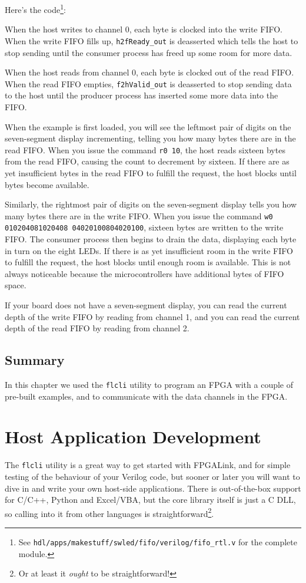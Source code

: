 Here's the code\footnote{See \texttt{hdl/apps/makestuff/swled/fifo/verilog/fifo\_rtl.v} for the complete module.}:


When the host writes to channel 0, each byte is clocked into the write FIFO. When the write FIFO fills up, \texttt{h2fReady\_out} is deasserted which tells the host to stop sending until the consumer process has freed up some room for more data.

When the host reads from channel 0, each byte is clocked out of the read FIFO. When the read FIFO empties, \texttt{f2hValid\_out} is deasserted to stop sending data to the host until the producer process has inserted some more data into the FIFO.

When the example is first loaded, you will see the leftmost pair of digits on the seven-segment display incrementing, telling you how many bytes there are in the read FIFO. When you issue the command \texttt{r0 10}, the host reads sixteen bytes from the read FIFO, causing the count to decrement by sixteen. If there are as yet insufficient bytes in the read FIFO to fulfill the request, the host blocks until bytes become available.

Similarly, the rightmost pair of digits on the seven-segment display tells you how many bytes there are in the write FIFO. When you issue the command \texttt{w0 010204081020408 04020100804020100}, sixteen bytes are written to the write FIFO. The consumer process then begins to drain the data, displaying each byte in turn on the eight LEDs. If there is as yet insufficient room in the write FIFO to fulfill the request, the host blocks until enough room is available. This is not always noticeable because the microcontrollers have additional bytes of FIFO space.

If your board does not have a seven-segment display, you can read the current depth of the write FIFO by reading from channel 1, and you can read the current depth of the read FIFO by reading from channel 2.

\subsection{Summary}
In this chapter we used the \texttt{flcli} utility to program an FPGA with a couple of pre-built examples, and to communicate with the data channels in the FPGA.

\newpage
\section{Host Application Development}
The \texttt{flcli} utility is a great way to get started with FPGALink, and for simple testing of the behaviour of your Verilog code, but sooner or later you will want to dive in and write your own host-side applications. There is out-of-the-box support for C/C++, Python and Excel/VBA, but the core library itself is just a C DLL, so calling into it from other languages is straightforward\footnote{Or at least it \textit{ought} to be straightforward!}.


